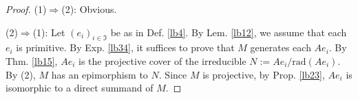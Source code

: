 \documentclass[11pt,b5paper,notitlepage]{article}
\theoremstyle{definition}
\theoremstyle{plain}
\newtheorem{pp}[df]{Proposition}
\newcommand{\fk}{\mathfrak}
\newcommand{\mc}{\mathcal}
\newcommand{\scr}{\mathscr}
\newcommand{\Coh}{\mathrm{Coh}_{\mathrm L}}
\newcommand{\rad}{\mathrm{rad}}
\numberwithin{equation}{section}
\begin{document}
\begin{proof}
(1)$\Rightarrow$(2): Obvious.

(2)$\Rightarrow$(1): Let $(e_i)_{i\in\fk I}$ be as in Def. \ref{lb4}. By Lem. \ref{lb12}, we assume that each $e_i$ is primitive. By Exp. \ref{lb34}, it suffices to prove that $M$ generates each $Ae_i$. By Thm. \ref{lb15}, $Ae_i$ is the projective cover of the irreducible $N:=Ae_i/\rad(Ae_i)$. By (2), $M$ has an epimorphism to $N$. Since $M$ is projective, by Prop. \ref{lb23}, $Ae_i$ is isomorphic to a direct summand of $M$.
\end{proof}

\end{document}
